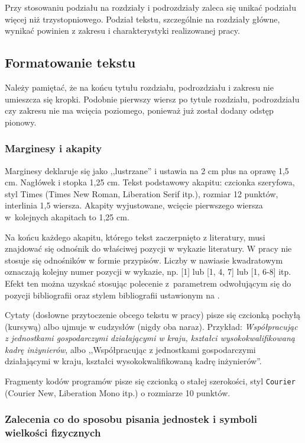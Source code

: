 \documentclass[12pt,twoside,openright]{article}
\begin{document}
Przy stosowaniu podziału na rozdziały i podrozdziały zaleca się unikać podziału więcej niż trzystopniowego. Podział tekstu, szczególnie na rozdziały główne, wynikać powinien z zakresu i charakterystyki realizowanej pracy.

\subsection{Formatowanie tekstu}

Należy pamiętać, że na końcu tytułu rozdziału, podrozdziału i zakresu nie umieszcza się kropki.
Podobnie pierwszy wiersz po tytule rozdziału, podrozdziału czy zakresu nie ma wcięcia poziomego, ponieważ już został dodany odstęp pionowy.

\subsubsection{Marginesy i akapity}

Marginesy deklaruje się jako ,,lustrzane'' i ustawia na 2 cm plus na oprawę 1,5 cm. 
Nagłówek i stopka 1,25 cm.
Tekst podstawowy akapitu: czcionka szeryfowa, styl Times (Times New Roman, Liberation Serif itp.), rozmiar 12 punktów, interlinia 1,5 wiersza.
Akapity wyjustowane, wcięcie pierwszego wiersza w~kolejnych akapitach to 1,25 cm. 

Na końcu każdego akapitu, którego tekst zaczerpnięto z literatury, musi znajdować się odnośnik do właściwej pozycji w wykazie literatury. 
W pracy nie stosuje się odnośników w formie przypisów.
Liczby w nawiasie kwadratowym oznaczają kolejny numer pozycji w wykazie, np. [1] lub [1, 4, 7] lub [1, 6-8] itp.
Efekt ten można uzyskać stosując polecenie  z~parametrem odwołującym się do pozycji bibliografii oraz stylem bibliografii ustawionym na .

Cytaty (dosłowne przytoczenie obcego tekstu w pracy) pisze się czcionką pochyłą (kursywą) albo ujmuje w cudzysłów (nigdy oba naraz). Przykład: \emph{Współpracując z jednostkami gospodarczymi działającymi w kraju, kształci wysokokwalifikowaną kadrę inżynierów}, albo ,,Współpracując z jednostkami gospodarczymi działającymi w kraju, kształci wysokokwalifikowaną kadrę inżynierów''.

Fragmenty kodów programów pisze się czcionką o stałej szerokości, styl \footnotesize {\texttt{Courier}}
\normalsize{(Courier New, Liberation Mono itp.) o rozmiarze 10 punktów.}


\subsubsection{Zalecenia co do sposobu pisania jednostek i symboli wielkości fizycznych}
\end{document}
